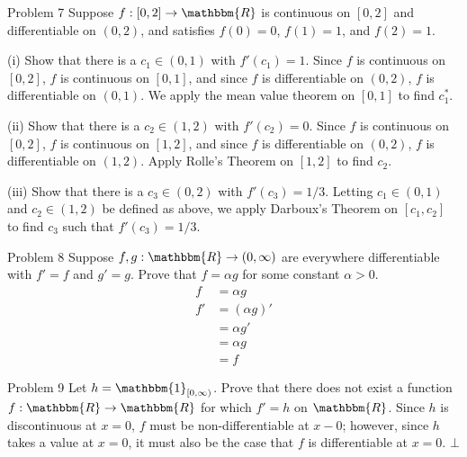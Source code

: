 \documentclass[8pt]{extarticle}
\newcommand{\R}{\mathbbm{R}}
\begin{document}
  \begin{problem}{Problem 7}
    Suppose $f: [0,2]\rightarrow \R$ is continuous on $[0,2]$ and differentiable on $(0,2)$, and satisfies $f(0) = 0$, $f(1) = 1$, and $f(2) = 1$.
    \tcblower
    \begin{problem}{(i)}
      Show that there is a $c_1\in (0,1)$ with $f'(c_1) = 1$.
      \tcblower
      Since $f$ is continuous on $[0,2]$, $f$ is continuous on $[0,1]$, and since $f$ is differentiable on $(0,2)$, $f$ is differentiable on $(0,1)$. We apply the mean value theorem on $[0,1]$ to find $c_1^{\ast}$. 
    \end{problem}
    \begin{problem}{(ii)}
      Show that there is a $c_2\in (1,2)$ with $f'(c_2) = 0$.
      \tcblower
      Since $f$ is continuous on $[0,2]$, $f$ is continuous on $[1,2]$, and since $f$ is differentiable on $(0,2)$, $f$ is differentiable on $(1,2)$. Apply Rolle's Theorem on $[1,2]$ to find $c_2$.
    \end{problem}
    \begin{problem}{(iii)}
      Show that there is a $c_3\in (0,2)$ with $f'(c_3) = 1/3$.
      \tcblower
      Letting $c_1\in (0,1)$ and $c_2\in (1,2)$ be defined as above, we apply Darboux's Theorem on $[c_1,c_2]$ to find $c_3$ such that $f'(c_3) = 1/3$.
    \end{problem}
  \end{problem}
  \begin{problem}{Problem 8}
    Suppose $f,g: \R\rightarrow (0,\infty)$ are everywhere differentiable with $f' = f$ and $g' = g$. Prove that $f = \alpha g$ for some constant $\alpha > 0$.
    \tcblower
    \begin{align*}
      f &= \alpha g\\
      f' &= (\alpha g)'\\
         &= \alpha g'\\
         &= \alpha g\\
         &= f
    \end{align*}
  \end{problem}
  \begin{problem}{Problem 9}
    Let $h = \mathbbm{1}_{[0,\infty)}$. Prove that there does not exist a function $f: \R\rightarrow\R$ for which $f' = h$ on $\R$.
    \tcblower
    Since $h$ is discontinuous at $x=0$, $f$ must be non-differentiable at $x-0$; however, since $h$ takes a value at $x=0$, it must also be the case that $f$ is differentiable at $x=0$. $\bot$
  \end{problem}
\end{document}
